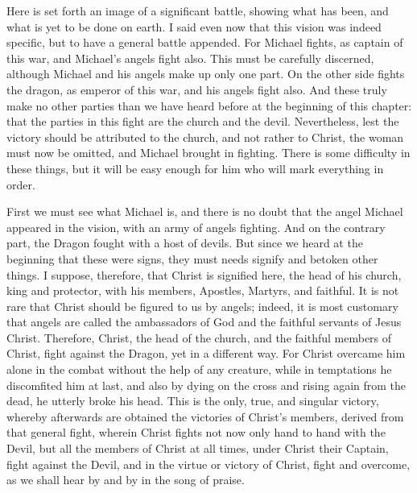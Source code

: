 Here is set forth an image of a significant battle, showing what has been, and what is yet to be done on earth. I said even now that this vision was indeed specific, but to have a general battle appended. For Michael fights, as captain of this war, and Michael’s angels fight also. This must be carefully discerned, although Michael and his angels make up only one part. On the other side fights the dragon, as emperor of this war, and his angels fight also. And these truly make no other parties than we have heard before at the beginning of this chapter: that the parties in this fight are the church and the devil. Nevertheless, lest the victory should be attributed to the church, and not rather to Christ, the woman must now be omitted, and Michael brought in fighting. There is some difficulty in these things, but it will be easy enough for him who will mark everything in order.

First we must see what Michael is, and there is no doubt that the angel Michael appeared in the vision, with an army of angels fighting. And on the contrary part, the Dragon fought with a host of devils. But since we heard at the beginning that these were signs, they must needs signify and betoken other things. I suppose, therefore, that Christ is signified here, the head of his church, king and protector, with his members, Apostles, Martyrs, and faithful. It is not rare that Christ should be figured to us by angels; indeed, it is most customary that angels are called the ambassadors of God and the faithful servants of Jesus Christ. Therefore, Christ, the head of the church, and the faithful members of Christ, fight against the Dragon, yet in a different way. For Christ overcame him alone in the combat without the help of any creature, while in temptations he discomfited him at last, and also by dying on the cross and rising again from the dead, he utterly broke his head. This is the only, true, and singular victory, whereby afterwards are obtained the victories of Christ's members, derived from that general fight, wherein Christ fights not now only hand to hand with the Devil, but all the members of Christ at all times, under Christ their Captain, fight against the Devil, and in the virtue or victory of Christ, fight and overcome, as we shall hear by and by in the song of praise.


